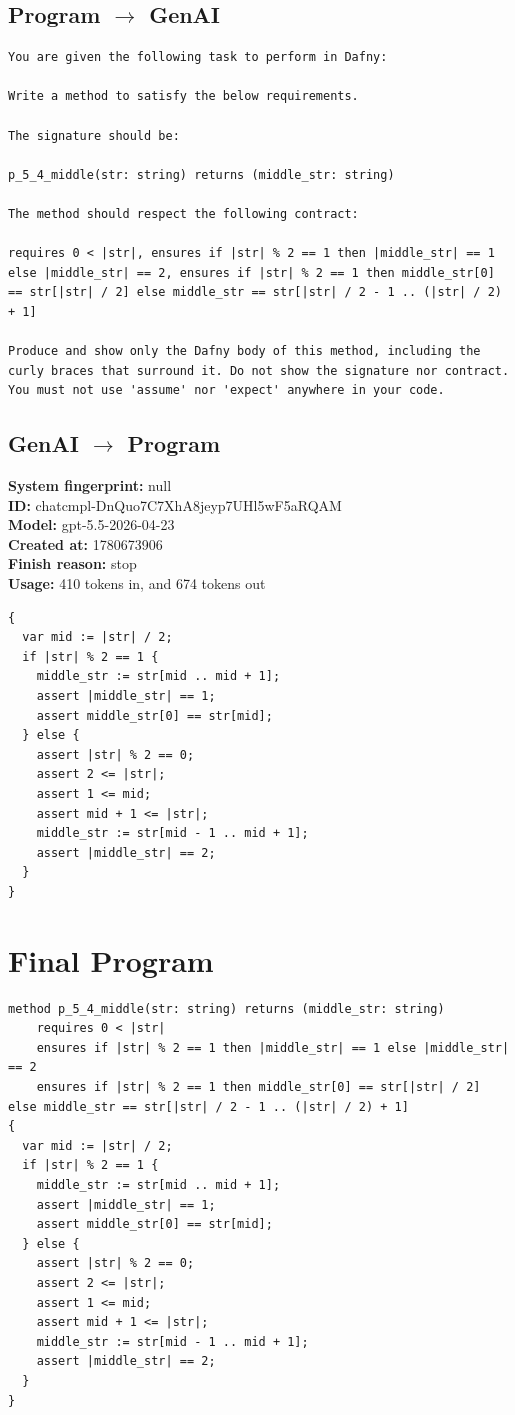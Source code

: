 \documentclass{article}
\begin{document}
\subsection*{Program $\rightarrow$ GenAI}
\begin{lstlisting}
You are given the following task to perform in Dafny:

Write a method to satisfy the below requirements.

The signature should be:

p_5_4_middle(str: string) returns (middle_str: string)

The method should respect the following contract:

requires 0 < |str|, ensures if |str| % 2 == 1 then |middle_str| == 1 else |middle_str| == 2, ensures if |str| % 2 == 1 then middle_str[0] == str[|str| / 2] else middle_str == str[|str| / 2 - 1 .. (|str| / 2) + 1]

Produce and show only the Dafny body of this method, including the curly braces that surround it. Do not show the signature nor contract. You must not use 'assume' nor 'expect' anywhere in your code.
\end{lstlisting}
\subsection*{GenAI $\rightarrow$ Program}
\textbf{System fingerprint: }null
\\\textbf{ID: }chatcmpl-DnQuo7C7XhA8jeyp7UHl5wF5aRQAM
\\\textbf{Model: }gpt-5.5-2026-04-23
\\\textbf{Created at: }1780673906
\\\textbf{Finish reason: }stop
\\\textbf{Usage: }410 tokens in, and 674 tokens out
\begin{lstlisting}
{
  var mid := |str| / 2;
  if |str| % 2 == 1 {
    middle_str := str[mid .. mid + 1];
    assert |middle_str| == 1;
    assert middle_str[0] == str[mid];
  } else {
    assert |str| % 2 == 0;
    assert 2 <= |str|;
    assert 1 <= mid;
    assert mid + 1 <= |str|;
    middle_str := str[mid - 1 .. mid + 1];
    assert |middle_str| == 2;
  }
}
\end{lstlisting}
\section*{Final Program}
\begin{lstlisting}
method p_5_4_middle(str: string) returns (middle_str: string)
	requires 0 < |str|
	ensures if |str| % 2 == 1 then |middle_str| == 1 else |middle_str| == 2
	ensures if |str| % 2 == 1 then middle_str[0] == str[|str| / 2] else middle_str == str[|str| / 2 - 1 .. (|str| / 2) + 1]
{
  var mid := |str| / 2;
  if |str| % 2 == 1 {
    middle_str := str[mid .. mid + 1];
    assert |middle_str| == 1;
    assert middle_str[0] == str[mid];
  } else {
    assert |str| % 2 == 0;
    assert 2 <= |str|;
    assert 1 <= mid;
    assert mid + 1 <= |str|;
    middle_str := str[mid - 1 .. mid + 1];
    assert |middle_str| == 2;
  }
}
\end{lstlisting}
\end{document}
